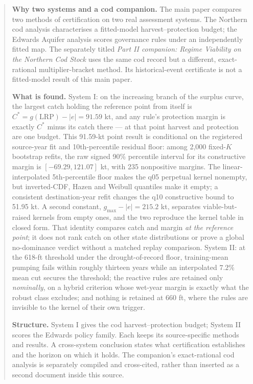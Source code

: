 \documentclass[11pt]{article}
\begin{document}
\begin{abstract}
\noindent\textbf{Why two systems and a cod companion.} The main paper compares two
methods of certification on two real assessment systems. The Northern cod analysis
characterises a fitted-model harvest--protection budget; the Edwards Aquifer analysis
scores governance rules under an independently fitted map. The separately titled
\emph{Part II companion: Regime Viability on the Northern Cod Stock} uses the
same cod record but a different, exact-rational multiplier-bracket method. Its
historical-event certificate is not a fitted-model result of this main paper.

\noindent\textbf{What is found.} System I: on the increasing branch of the surplus curve, the largest
catch holding the reference point from itself is $C^* = g(\mathrm{LRP}) - |e| = 91.59$ kt, and any
rule's protection margin is exactly $C^*$ minus its catch there --- at that point harvest and
protection are one budget. This 91.59-kt point result is conditional on the
registered source-year fit and 10th-percentile residual floor: among 2,000
fixed-$K$ bootstrap refits, the raw signed 90\% percentile interval for its
constructive margin is $[-69.29,121.07]$ kt, with 235 nonpositive margins.
The linear-interpolated 5th-percentile floor makes the q05 perpetual kernel
nonempty, but inverted-CDF, Hazen and Weibull quantiles make it empty; a
consistent destination-year refit changes the q10 constructive bound to
51.95 kt. A second constant, $g_{\max} - |e| = 215.2$ kt, separates viable-but-raised
kernels from empty ones, and the two reproduce the kernel table in closed form. That identity compares catch and margin \emph{at the reference point};
it does not rank catch on other state distributions or prove a global
no-dominance verdict without a matched replay comparison. System II: at the
618-ft threshold under the drought-of-record floor, training-mean pumping fails within roughly
thirteen years while an interpolated $7.2\%$ mean cut secures the threshold; the reactive rules are
retained only \emph{nominally}, on a hybrid criterion whose wet-year margin is exactly what the
robust class excludes; and nothing is retained at 660 ft, where the rules are invisible to the
kernel of their own trigger.

\noindent\textbf{Structure.} System I gives the cod harvest--protection budget;
System II scores the Edwards policy family. Each keeps its source-specific methods and
results. A cross-system conclusion states what certification establishes and the horizon
on which it holds. The companion's exact-rational cod analysis is separately compiled
and cross-cited, rather than inserted as a second document inside this source.
\end{abstract}
\end{document}
